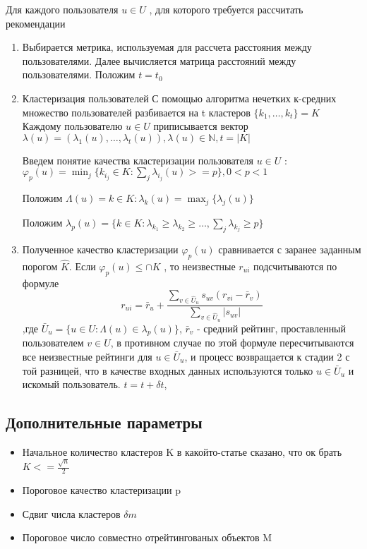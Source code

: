 \documentclass[12pt]{article} %
\begin{document}
Для каждого пользователя $u \in U$ , для которого требуется рассчитать рекомендации

\begin{enumerate} 


\item Выбирается метрика, используемая для рассчета расстояния между пользователями. Далее вычисляется матрица расстояний между пользователями. Положим $t = t_{0}$


\item Кластеризация пользователей
С помощью алгоритма нечетких к-средних множество пользователей разбивается на t кластеров $\{k_{1},\dots,k_{t}\}=K$
Каждому пользователю $u \in U$ приписывается вектор $\lambda(u)=(\lambda_{1}(u),\dots,\lambda_{t}(u)), \lambda(u)\in\mathbb{N}, t=|K|$

Введем понятие качества кластеризации пользователя $u \in U$ :
$\varphi_{p}(u) = \min_{j} \{k_{i_{j}} \in K: \sum_{j} \lambda_{i_{j}}(u) >= p\}, 0 < p < 1$ 
\par
Положим $\Lambda(u) = k \in K: \lambda_{k}(u) = \max_{j} \{\lambda_{j}(u)\}$ 
\par
Положим $\lambda_{p}(u) = \{k \in K: \lambda_{k_{1}} \geq\lambda_{k_{2}} \geq\dots, \sum_{j}\lambda_{k_{j}} \geq p\}$

\item Полученное качество кластеризации $\varphi_{p}(u)$ сравнивается с заранее заданным порогом $\hat{K}$. Если $\varphi_{p}(u) \leq \cap{K}$ , то неизвестные $r_{ui}$ подсчитываются по формуле 
\[
	r_{ui} = \bar{r}_{u} + \frac{\sum_{v \in \hat{U}_{u}} s_{uv}(r_{vi} - \bar{r}_v)}{\sum_{v \in \hat{U}_{u}} |s_{uv}|}
\] ,где $\bar{U}_{u} = \{u \in U:\Lambda(u) \in  \lambda_{p}(u)\}$, $\bar{r}_{v}$ - средний рейтинг, проставленный пользователем $v \in U$, в противном случае по этой формуле пересчитываются все неизвестные рейтинги для $u \in \bar{U}_{u}$, и процесс возвращается к стадии 2 с той разницей, что в качестве входных данных используются только $u \in \bar{U}_{u}$ и искомый пользователь.
$t = t + \delta t$, 

\end{enumerate}

\subsection{Дополнительные параметры}

\begin{itemize}

\item Начальное количество кластеров K
в какойто-статье сказано, что ок брать $K <= \frac{\sqrt{n}}{2} $
\item Пороговое качество кластеризации p
\item Сдвиг числа кластеров $\delta m$
\item Пороговое число совместно отрейтингованых объектов M

\end{itemize}
\end{document}
